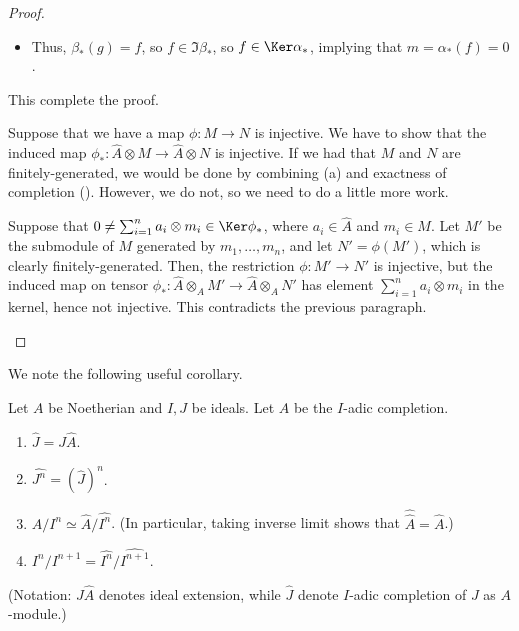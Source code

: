 \begin{proof}
\begin{alphenum}
\begin{itemize}
\begin{itemize}
    \item Thus, $\beta_*(g) = f$, so $f\in \Im\beta_*$,
    so $f\in \Ker\alpha_*$, implying that $m=\alpha_*(f)=0$.
    \end{itemize}
    This complete the proof.
    \end{itemize}
    \item 
    Suppose that we have a map $\phi : M\to N$ is injective.
    We have to show that the induced map 
    $\phi_* : \widehat A\otimes M\to \widehat A\otimes N$
    is injective.
    If we had that $M$ and $N$ are finitely-generated,
    we would be done by combining (a) and 
    exactness of completion ().
    However, we do not, so we need to do a little more work.

    Suppose that $0\neq\sum_{i=1}^n a_i\otimes m_i \in \Ker\phi_*$,
    where $a_i\in\widehat A$ and $m_i\in M$.
    Let $M'$ be the submodule of $M$
    generated by $m_1,\dots,m_n$,
    and let $N' = \phi(M')$,
    which is clearly finitely-generated.
    Then, the restriction $\phi : M'\to N'$
    is injective, but the induced map on tensor
    $\phi_* : \widehat A\otimes_A M' 
    \to \widehat A \otimes_A N'$
    has element $\sum_{i=1}^n a_i\otimes m_i$ in the kernel,
    hence not injective.
    This contradicts the previous paragraph.
    \qedhere
    \end{alphenum}
\end{proof}
We note the following useful corollary.
\begin{corollary}
    \label{cor:completion_isomorphism}
    Let $A$ be Noetherian and $I,J$ be ideals.
    Let $\widehat A$ be the $I$-adic completion.
    \begin{enumerate}[label=(\alph*)]
     \item $\widehat J = J\widehat A$.
     \item $\widehat{J^n} = (\widehat J)^n$.
     \item $A/I^n \simeq \widehat A/\widehat{I^n}$.
     (In particular, taking inverse limit
     shows that $\widehat{\widehat A} = \widehat A$.)
      \item $I^n/I^{n+1} = \widehat{I^n} / \widehat{I^{n+1}}$.
     \end{enumerate}
     (Notation: $J\widehat A$ denotes ideal extension,
     while $\widehat J$ denote $I$-adic completion
     of $J$ as $A$-module.)
\end{corollary}
